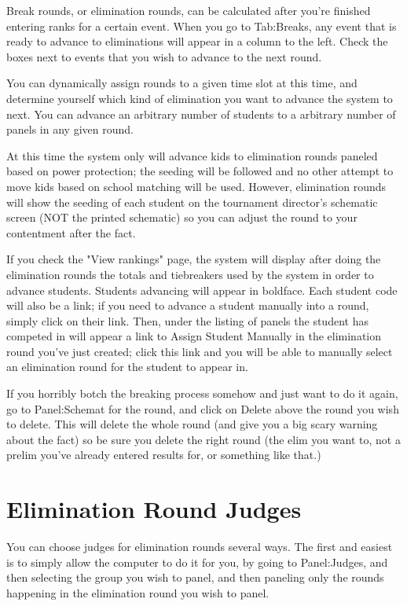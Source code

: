 \documentclass[12pt]{report} \usepackage {fullpage} \usepackage{times}
\begin{document}
Break rounds, or elimination rounds, can be calculated after you're
finished entering ranks for a certain event.  When you go to Tab:Breaks,
any event that is ready to advance to eliminations will appear in a column
to the left.  Check the boxes next to events that you wish to advance to
the next round.

You can dynamically assign rounds to a given time slot at this time, and
determine yourself which kind of elimination you want to advance the system
to next.   You can advance an arbitrary number of students to a arbitrary
number of panels in any given round.   

At this time the system only will advance kids to elimination rounds
paneled based on power protection; the seeding will be followed and no
other attempt to move kids based on school matching will be used.
However, elimination rounds will show the seeding of each student on the
tournament director's schematic screen (NOT the printed schematic) so you
can adjust the round to your contentment after the fact.

If you check the "View rankings" page, the system will display after doing
the elimination rounds the totals and tiebreakers used by the system in
order to advance students.  Students advancing will appear in boldface.
Each student code will also be a link; if you need to advance a student
manually into a round, simply click on their link.  Then, under the listing
of panels the student has competed in will appear a link to Assign Student
Manually in the elimination round you've just created; click this link and
you will be able to manually select an elimination round for the student to
appear in.

If you horribly botch the breaking process somehow and just want to do it
again, go to Panel:Schemat for the round, and click on Delete above the
round you wish to delete.   This will delete the whole round (and give you
a big scary warning about the fact) so be sure you delete the right round
(the elim you want to, not a prelim you've already entered results for, or
something like that.)

\section{Elimination Round Judges}

You can choose judges for elimination rounds several ways.  The first and
easiest is to simply allow the computer to do it for you, by going to
Panel:Judges, and then selecting the group you wish to panel, and then
paneling only the rounds happening in the elimination round you wish to
panel.
\end{document}
